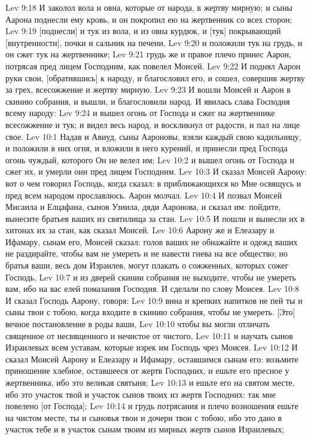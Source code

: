 Lev 9:18  И заколол вола и овна, которые от народа, в жертву мирную; и сыны Аарона поднесли ему кровь, и он покропил ею на жертвенник со всех сторон;
Lev 9:19  [поднесли] и тук из вола, и из овна курдюк, и [тук] покрывающий [внутренности], почки и сальник на печени,
Lev 9:20  и положили тук на грудь, и он сжег тук на жертвеннике;
Lev 9:21  грудь же и правое плечо принес Аарон, потрясая пред лицем Господним, как повелел Моисей.
Lev 9:22  И поднял Аарон руки свои, [обратившись] к народу, и благословил его, и сошел, совершив жертву за грех, всесожжение и жертву мирную.
Lev 9:23  И вошли Моисей и Аарон в скинию собрания, и вышли, и благословили народ. И явилась слава Господня всему народу:
Lev 9:24  и вышел огонь от Господа и сжег на жертвеннике всесожжение и тук; и видел весь народ, и воскликнул от радости, и пал на лице свое.
Lev 10:1  Надав и Авиуд, сыны Аароновы, взяли каждый свою кадильницу, и положили в них огня, и вложили в него курений, и принесли пред Господа огонь чуждый, которого Он не велел им;
Lev 10:2  и вышел огонь от Господа и сжег их, и умерли они пред лицем Господним.
Lev 10:3  И сказал Моисей Аарону: вот о чем говорил Господь, когда сказал: в приближающихся ко Мне освящусь и пред всем народом прославлюсь. Аарон молчал.
Lev 10:4  И позвал Моисей Мисаила и Елцафана, сынов Узиила, дяди Ааронова, и сказал им: пойдите, вынесите братьев ваших из святилища за стан.
Lev 10:5  И пошли и вынесли их в хитонах их за стан, как сказал Моисей.
Lev 10:6  Аарону же и Елеазару и Ифамару, сынам его, Моисей сказал: голов ваших не обнажайте и одежд ваших не раздирайте, чтобы вам не умереть и не навести гнева на все общество; но братья ваши, весь дом Израилев, могут плакать о сожженных, которых сожег Господь,
Lev 10:7  и из дверей скинии собрания не выходите, чтобы не умереть вам, ибо на вас елей помазания Господня. И сделали по слову Моисея.
Lev 10:8  И сказал Господь Аарону, говоря:
Lev 10:9  вина и крепких напитков не пей ты и сыны твои с тобою, когда входите в скинию собрания, чтобы не умереть. [Это] вечное постановление в роды ваши,
Lev 10:10  чтобы вы могли отличать священное от несвященного и нечистое от чистого,
Lev 10:11  и научать сынов Израилевых всем уставам, которые изрек им Господь чрез Моисея.
Lev 10:12  И сказал Моисей Аарону и Елеазару и Ифамару, оставшимся сынам его: возьмите приношение хлебное, оставшееся от жертв Господних, и ешьте его пресное у жертвенника, ибо это великая святыня;
Lev 10:13  и ешьте его на святом месте, ибо это участок твой и участок сынов твоих из жертв Господних: так мне повелено [от Господа];
Lev 10:14  и грудь потрясания и плечо возношения ешьте на чистом месте, ты и сыновья твои и дочери твои с тобою, ибо это дано в участок тебе и в участок сынам твоим из мирных жертв сынов Израилевых;
